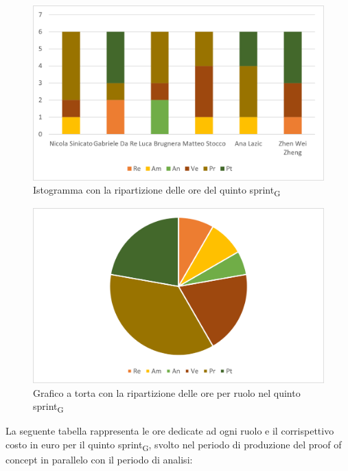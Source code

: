 \begin{figure}[H]
    \centering
    \includegraphics[scale=0.6]{img/grafi preventivo/istogrammi/proof/sprint5.png}
    \caption{Istogramma con la ripartizione delle ore del quinto sprint\textsubscript{G}}
\end{figure}
\begin{figure}[H]
    \centering
    \includegraphics[scale=0.6]{img/grafi preventivo/torta/proof/sprint5.png}
    \caption{Grafico a torta con la ripartizione delle ore per ruolo nel quinto sprint\textsubscript{G}}
\end{figure}
La seguente tabella rappresenta le ore dedicate ad ogni ruolo e il corrispettivo costo in euro per il quinto sprint\textsubscript{G}, svolto nel periodo di produzione del proof of concept in parallelo con il periodo di analisi:

